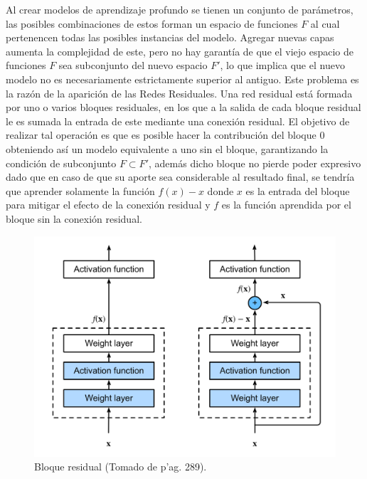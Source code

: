 Al crear modelos de aprendizaje profundo se tienen un conjunto de parámetros, las posibles combinaciones 
de estos forman un espacio de funciones $F$ al cual pertenencen todas las posibles instancias del modelo.
Agregar nuevas capas aumenta la complejidad de este, pero no hay garantía de que el viejo espacio 
de funciones $F$ sea subconjunto del nuevo espacio $F'$, lo que implica que el nuevo modelo no es necesariamente
estrictamente superior al antiguo. Este problema es la razón de la aparición de las Redes Residuales. 
Una red residual está formada por 
uno o varios bloques residuales, en los que a la salida de cada bloque residual le es sumada la entrada de 
este mediante una conexión residual.
El objetivo de realizar tal operación es que es posible hacer la contribución del bloque 0 obteniendo así
un modelo equivalente a uno sin el bloque, garantizando la condición de subconjunto $F \subset F'$, además 
dicho bloque no pierde poder expresivo dado que en caso de que su aporte sea considerable al resultado final, 
se tendría que aprender solamente la función $f(x) - x$ donde $x$ es la entrada del bloque para mitigar el 
efecto de la conexión residual y $f$ es la función aprendida por el bloque sin la conexión residual.

\begin{figure}[h!]
	\begin{center}
		\begin{center}
			\includegraphics[scale=.3]{Graphics/resnet.png}
        \end{center}
	    \caption{Bloque residual (Tomado de \cite{d2l} p'ag. 289).}\label{fig:res_block}
	\end{center}
\end{figure}

